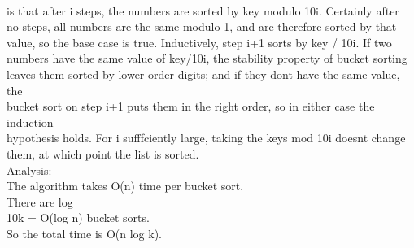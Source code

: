 \documentclass[a4paper,11pt]{article}
\begin{document}
\begin{flushleft}
{\\ is that after i steps, the numbers are sorted by key modulo 10i. Certainly after
\\ no steps, all numbers are the same modulo 1, and are therefore sorted by that
\\ value, so the base case is true. Inductively, step i+1 sorts by key / 10i. If two
\\ numbers have the same value of key/10i, the stability property of bucket sorting
\\ leaves them sorted by lower order digits; and if they dont have the same value, the
\\ bucket sort on step i+1 puts them in the right order, so in either case the induction
\\ hypothesis holds. For i sufffciently large, taking the keys mod 10i doesnt change
\\ }
{
them, at which point the list is sorted.
\\ Analysis:
\\ The algorithm takes O(n) time per bucket sort.
\\ There are log
\\ 10\space k = O(log n) bucket sorts.
\\ So the total time is O(n log k).
}
\end{flushleft}
\newpage
\end{document}
